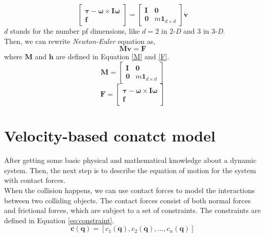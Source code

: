     \begin{equation}
        \left[ \begin{array}{c} \pmb{\tau} - \pmb{\omega} \times \pmb{I} \pmb{\omega}\\ \pmb{f} \end{array}\right] = \left[ \begin{array}{cc} \pmb{I} & \pmb{0} \\ \pmb{0}& m\pmb{1}_{d\times d}\end{array} \right] \dot{\mathbf{v}}
    \end{equation}
    $d$ stands for the number pf dimensions, like $d=2$ in $2$-\textit{D} and $3$ in $3$-\textit{D}. \\

    Then, we can rewrite \textit{Newton-Euler} equation as,
    \begin{equation}
        \pmb{M}\dot{\mathbf{v}} = \mathbf{F}
        \label{eq:newton}
    \end{equation}
    where $\pmb{M}$ and $\mathbf{h}$ are defined in Equation \ref{M} and \ref{F}.
    \begin{equation}
        \pmb{M} = \left[ \begin{array}{cc} \pmb{I} & \pmb{0} \\ \pmb{0} & m\pmb{1}_{d \times d}\end{array} \right]
        \label{M}
    \end{equation}
    \begin{equation}
        \mathbf{F} = \left[ \begin{array}{c} \pmb{\tau} - \pmb{\omega} \times \pmb{I} \pmb{\omega}\\ \pmb{f} \end{array}\right]
        \label{F}
    \end{equation}


\section{Velocity-based conatct model}
    After getting some basic physical and mathematical knowledge about a dynamic system. Then,  the next step is to describe the equation of motion for the system with contact forces.  \\

    When the collision happens, we can use contact forces to model the interactions between two colliding objects. The contact forces consist of both normal forces and frictional forces, which are subject to a set of constraints. The constraints are defined in Equation \ref{eq:constraint}.
    \begin{equation}
        \pmb{c}(\pmb{q}) = [c_1(\pmb{q}),c_2(\pmb{q}),...,c_n(\pmb{q})]
        \label{eq:constraint}
    \end{equation}

